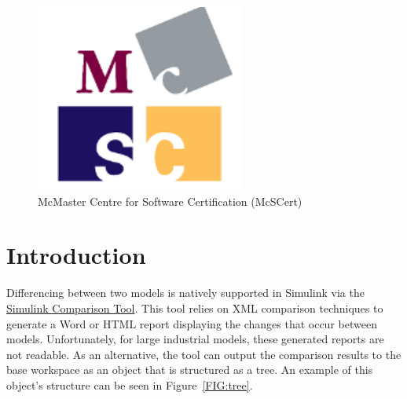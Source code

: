 \documentclass{article}
\title{\ToolName}
\date{\monthyeardate\today}
\makeatletter
\newcommand{\EditsObj}{\keyword{xmlcomp.Edits}\@\xspace}
\makeatother
\begin{document}
\maketitle
\vfill

\begin{figure}
	\centering
	\includegraphics[]{../figs/McSCert_Logo.pdf} \\
	McMaster Centre for Software Certification (McSCert)
\end{figure}

\newpage


\tableofcontents
\newpage

\section{Introduction}

Differencing between two models is natively supported in Simulink via the \href{https://www.mathworks.com/help/simulink/model-comparison.html}{Simulink Comparison Tool}. This tool relies on XML comparison techniques to generate a Word or HTML report displaying the changes that occur between models. Unfortunately, for large industrial models, these generated reports are not readable. As an alternative, the tool can output the comparison results to the \Matlab base workspace as an \EditsObj object that is structured as a tree. An example of this object's structure can be seen in Figure~\ref{FIG:tree}.
\end{document}
